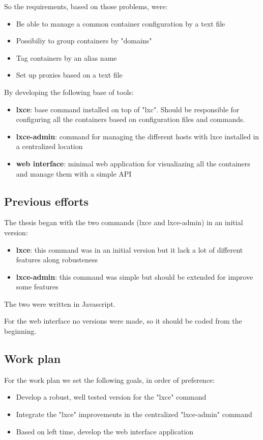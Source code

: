 So the requirements, based on those problems, were:
\begin{itemize}
	\item {Be able to manage a common container configuration by a text file}
	\item {Possibiliy to group containers by "domains"}
	\item {Tag containers by an alias name}
	\item {Set up proxies based on a text file}
\end{itemize}

By developing the following base of tools:
\begin{itemize}
	\item {\textbf{lxce}: base command installed on top of "lxc". Should be responsible for configuring all the containers based on configuration files and commands.}
	\item {\textbf{lxce-admin}: command for managing the different hosts with lxce installed in a centralized location}
	\item {\textbf{web interface}: minimal web application for visualiazing all the containers and manage them with a simple API}
\end{itemize}


\subsection{Previous efforts}
\label{ssec:previous}
The thesis began with the two commands (lxce and lxce-admin) in an initial version:
\begin{itemize}
	\item {\textbf{lxce}: this command was in an initial version but it lack a lot of different features along robusteness}
	\item {\textbf{lxce-admin}: this command was simple but should be extended for improve some features}
\end{itemize}
The two were written in Javascript.

For the web interface no versions were made, so it should be coded from the beginning.

\subsection{Work plan}
\label{ssec:gantt}
For the work plan we set the following goals, in order of preference:
\begin{itemize}
	\item {Develop a robust, well tested version for the "lxce" command}
	\item {Integrate the "lxce" improvements in the centralized "lxce-admin" command}
	\item {Based on left time, develop the web interface application}
\end{itemize}

